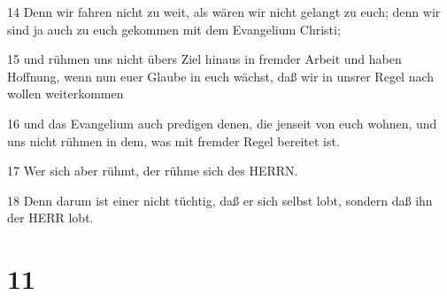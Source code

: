 \par 14 Denn wir fahren nicht zu weit, als wären wir nicht gelangt zu euch; denn wir sind ja auch zu euch gekommen mit dem Evangelium Christi;
\par 15 und rühmen uns nicht übers Ziel hinaus in fremder Arbeit und haben Hoffnung, wenn nun euer Glaube in euch wächst, daß wir in unsrer Regel nach wollen weiterkommen
\par 16 und das Evangelium auch predigen denen, die jenseit von euch wohnen, und uns nicht rühmen in dem, was mit fremder Regel bereitet ist.
\par 17 Wer sich aber rühmt, der rühme sich des HERRN.
\par 18 Denn darum ist einer nicht tüchtig, daß er sich selbst lobt, sondern daß ihn der HERR lobt.

\chapter{11}

